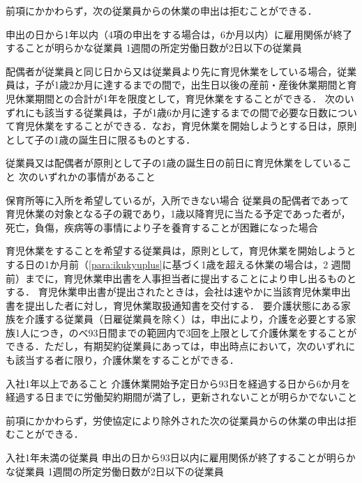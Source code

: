 \documentclass[11pt,a4paper]{jsarticle}
\begin{document}
\term 前項にかかわらず，次の従業員からの休業の申出は拒むことができる．
\begin{enumerate}
	\itm 申出の日から1年以内（4項の申出をする場合は，6か月以内）に雇用関係が終了することが明らかな従業員
	\itm 1週間の所定労働日数が2日以下の従業員
\end{enumerate}

\term 配偶者が従業員と同じ日から又は従業員より先に育児休業をしている場合，従業員は，子が1歳2か月に達するまでの間で，出生日以後の産前・産後休業期間と育児休業期間との合計が1年を限度として，育児休業をすることができる．
\label{para:ikukyuplus}
\term 次のいずれにも該当する従業員は，子が1歳6か月に達するまでの間で必要な日数について育児休業をすることができる．なお，育児休業を開始しようとする日は，原則として子の1歳の誕生日に限るものとする．
\begin{enumerate}
	\itm 従業員又は配偶者が原則として子の1歳の誕生日の前日に育児休業をしていること
	\itm 次のいずれかの事情があること
	\begin{enumerate}
		\itm 保育所等に入所を希望しているが，入所できない場合
		\itm 従業員の配偶者であって育児休業の対象となる子の親であり，1歳以降育児に当たる予定であった者が，死亡，負傷，疾病等の事情により子を養育することが困難になった場合
	\end{enumerate}
\end{enumerate}

\term 育児休業をすることを希望する従業員は，原則として，育児休業を開始しようとする日の1か月前（\ref{para:ikukyuplus}に基づく1歳を超える休業の場合は，2 週間前）までに，育児休業申出書を人事担当者に提出することにより申し出るものとする．
\term 育児休業申出書が提出されたときは，会社は速やかに当該育児休業申出書を提出した者に対し，育児休業取扱通知書を交付する．
要介護状態にある家族を介護する従業員（日雇従業員を除く）は，申出により，介護を必要とする家族1人につき，のべ93日間までの範囲内で3回を上限として介護休業をすることができる．ただし，有期契約従業員にあっては，申出時点において，次のいずれにも該当する者に限り，介護休業をすることができる．
\label{para:NursingLayoff}
\begin{enumerate}
	\itm 入社1年以上であること
	\itm 介護休業開始予定日から93日を経過する日から6か月を経過する日までに労働契約期間が満了し，更新されないことが明らかでないこと
\end{enumerate}

\term 前項にかかわらず，労使協定により除外された次の従業員からの休業の申出は拒むことができる．
\begin{enumerate}
	\itm 入社1年未満の従業員
	\itm 申出の日から93日以内に雇用関係が終了することが明らかな従業員
	\itm 1週間の所定労働日数が2日以下の従業員
\end{enumerate}
\end{document}
